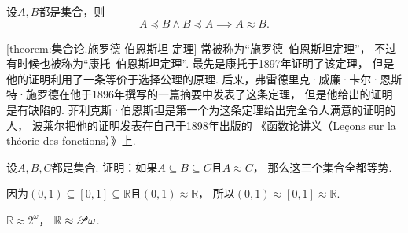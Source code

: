 \begin{theorem}\label{theorem:集合论.施罗德-伯恩斯坦-定理}
设\(A,B\)都是集合，则\[
	A \preceq B \land B \preceq A \implies A \approx B.
\]
\end{theorem}
\cref{theorem:集合论.施罗德-伯恩斯坦-定理}
常被称为“施罗德--伯恩斯坦定理”，
不过有时候也被称为“康托--伯恩斯坦定理”.
最先是康托于1897年证明了该定理，
但是他的证明利用了一条等价于选择公理的原理.
后来，弗雷德里克·威廉·卡尔·恩斯特·施罗德在他于1896年撰写的一篇摘要中发表了这条定理，
但是他给出的证明是有缺陷的.
菲利克斯·伯恩斯坦是第一个为这条定理给出完全令人满意的证明的人，
波莱尔把他的证明发表在自己于1898年出版的%
《函数论讲义（Le\c{c}ons sur la th\'eorie des fonctions）》上.

\begin{example}
设\(A,B,C\)都是集合.
证明：如果\(A \subseteq B \subseteq C\)且\(A \approx C\)，
那么这三个集合全都等势.
\end{example}

\begin{example}
因为\((0,1)\subseteq[0,1]\subseteq\mathbb{R}\)且\((0,1)\approx\mathbb{R}\)，
所以\((0,1)\approx[0,1]\approx\mathbb{R}\).
\end{example}

\begin{example}
\(\mathbb{R}\approx2^\omega\)，
\(\mathbb{R}\approx\mathscr{P}\omega\).
\end{example}
